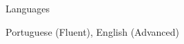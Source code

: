\documentclass{resume} %
\begin{document}

\begin{rSection}{Languages}

Portuguese (Fluent), English (Advanced)
    
\end{rSection}





\end{document}
